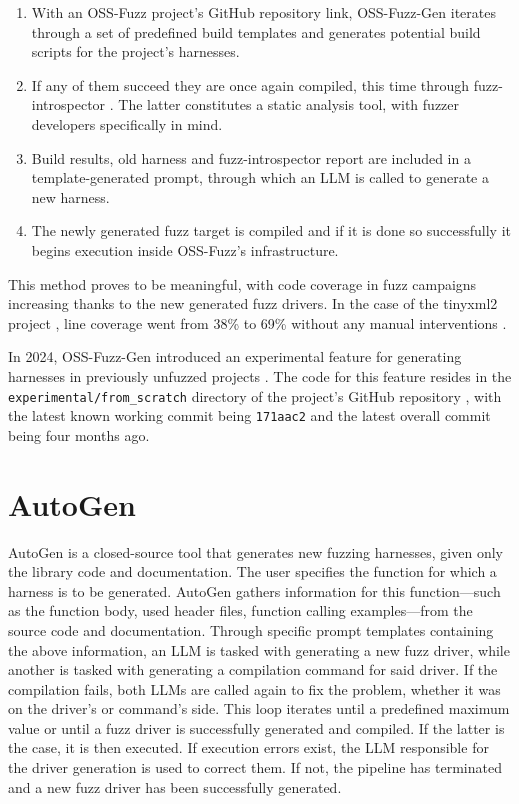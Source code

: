 \documentclass[
  a4paper,
]{scrreprt}
\providecommand{\tightlist}{%
  \setlength{\itemsep}{0pt}\setlength{\parskip}{0pt}}
\theoremstyle{definition}
\theoremstyle{remark}
\begin{document}
\begin{enumerate}
\def\labelenumi{\arabic{enumi}.}
\tightlist
\item
  With an OSS-Fuzz project's GitHub repository link, OSS-Fuzz-Gen
  iterates through a set of predefined build templates and generates
  potential build scripts for the project's harnesses.
\item
  If any of them succeed they are once again compiled, this time through
  fuzz-introspector \autocite{fuzz-introspector}. The latter constitutes
  a static analysis tool, with fuzzer developers specifically in mind.
\item
  Build results, old harness and fuzz-introspector report are included
  in a template-generated prompt, through which an LLM is called to
  generate a new harness.
\item
  The newly generated fuzz target is compiled and if it is done so
  successfully it begins execution inside OSS-Fuzz's infrastructure.
\end{enumerate}

This method proves to be meaningful, with code coverage in fuzz
campaigns increasing thanks to the new generated fuzz drivers. In the
case of the tinyxml2 project \autocite{thomason2025}, line coverage went
from 38\% to 69\% without any manual interventions \autocite{liu2023}.

In 2024, OSS-Fuzz-Gen introduced an experimental feature for generating
harnesses in previously unfuzzed projects
\autocite{oss-fuzzmaintainers2024}. The code for this feature resides in
the \texttt{experimental/from\_scratch} directory of the project's
GitHub repository \autocite{oss-fuzz-gen}, with the latest known working
commit being \texttt{171aac2} and the latest overall commit being four
months ago.

\section{AutoGen}\label{autogen}

AutoGen \autocite{sun2024} is a closed-source tool that generates new
fuzzing harnesses, given only the library code and documentation. The
user specifies the function for which a harness is to be generated.
AutoGen gathers information for this function---such as the function
body, used header files, function calling examples---from the source
code and documentation. Through specific prompt templates containing the
above information, an LLM is tasked with generating a new fuzz driver,
while another is tasked with generating a compilation command for said
driver. If the compilation fails, both LLMs are called again to fix the
problem, whether it was on the driver's or command's side. This loop
iterates until a predefined maximum value or until a fuzz driver is
successfully generated and compiled. If the latter is the case, it is
then executed. If execution errors exist, the LLM responsible for the
driver generation is used to correct them. If not, the pipeline has
terminated and a new fuzz driver has been successfully generated.
\end{document}

